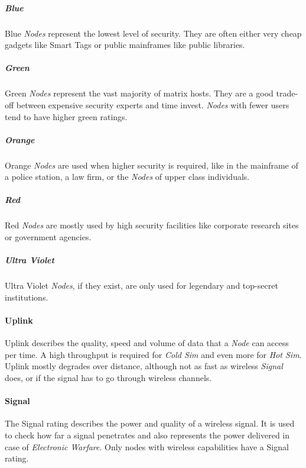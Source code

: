 \subparagraph{Blue} Blue \emph{Nodes} represent the lowest level of security.
They are often either very cheap gadgets like Smart Tags or public mainframes
like public libraries.

\subparagraph{Green} Green \emph{Nodes} represent the vast majority of matrix hosts.
They are a good trade-off between expensive security experts and time invest.
\emph{Nodes} with fewer users tend to have higher green ratings.

\subparagraph{Orange} Orange \emph{Nodes} are used when higher security is required,
like in the mainframe of a police station, a law firm, or the \emph{Nodes} of upper
class individuals.

\subparagraph{Red} Red \emph{Nodes} are mostly used by high security facilities like
corporate research sites or  government agencies.

\subparagraph{Ultra Violet} Ultra Violet \emph{Nodes}, if they exist, are only used
for legendary and top-secret institutions.


\paragraph{Uplink}

Uplink describes the quality, speed and volume of data that a \emph{Node}
can access per time. A high throughput is required for \emph{Cold Sim} and even
more for \emph{Hot Sim}. Uplink mostly degrades over distance, although not as
fast as wireless \emph{Signal} does, or if the signal has to go through wireless
channels.

\paragraph{Signal}

The Signal rating describes the power and quality of a wireless signal. It is
used to check how far a signal penetrates and also represents the power delivered
in case of \emph{Electronic Warfare}.
Only nodes with wireless capabilities have a Signal rating.


